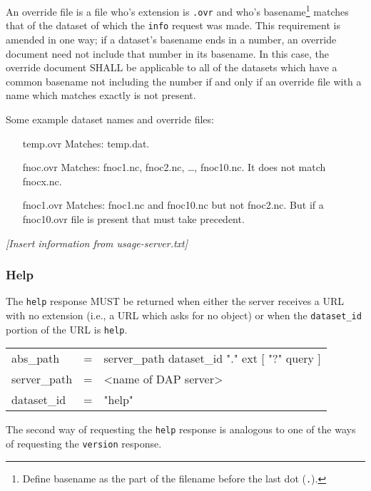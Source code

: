 \documentclass{article}
\begin{document}
\begin{enumerate}
  An override file is a file who's extension is \texttt{.ovr} and who's
  basename\footnote{Define basename as the part of the filename before the
  last dot (\texttt{.}).} matches that of the dataset of which the
  \texttt{info} request was made. This requirement is amended in one way; if
  a dataset's basename ends in a number, an override document need not
  include that number in its basename. In this case, the override document
  SHALL be applicable to all of the datasets which have a common basename not
  including the number if and only if an override file with a name which
  matches exactly is not present.

  Some example dataset names and override files:
  \begin{itemize}
    \item [temp.ovr] Matches: temp.dat.
    \item [fnoc.ovr] Matches: fnoc1.nc, fnoc2.nc, \ldots, fnoc10.nc. It does
      not match fnocx.nc.
    \item [fnoc1.ovr] Matches: fnoc1.nc and fnoc10.nc but not fnoc2.nc. But
      if a fnoc10.ovr file is present that must take precedent.
  \end{itemize}

\end{enumerate}

\emph{[Insert information from usage-server.txt]}

\subsubsection{Help}
\label{sec:help}
The \texttt{help} response MUST be returned when either the server receives a
\ac{URL} with no extension (i.e., a \ac{URL} which asks for no object) or
when the \texttt{dataset\_id} portion of the \ac{URL} is \texttt{help}.

\begin{ttfamily}
\begin{center}
\begin{tabular}{lll}
abs\_path & = & server\_path dataset\_id "." ext [ "?" query ] \\
server\_path & = & <name of DAP server> \\
dataset\_id & = & "help" \\
\end{tabular}
\end{center}
\end{ttfamily}

The second way of requesting the \texttt{help} response is analogous to one
of the ways of requesting the \texttt{version} response.
\end{document}
